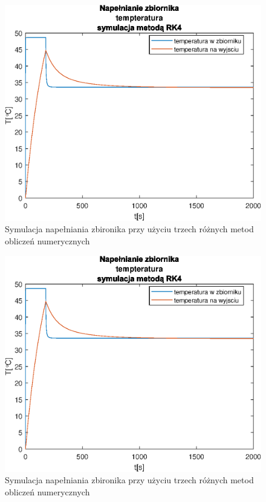 \begin{figure}[tb]
   \centering
   \includegraphics{img/object-simulation/method-comparison-flow.eps}
   \caption{Symulacja napełniania zbironika przy użyciu trzech różnych metod obliczeń numerycznych}
   \label{fig:method-comparison-flow}
\end{figure}
            
\begin{figure}[tb]
   \centering
   \includegraphics{img/object-simulation/method-comparison-flow.eps}
   \caption{Symulacja napełniania zbironika przy użyciu trzech różnych metod obliczeń numerycznych}
   \label{fig:method-comparison-flow}
\end{figure}
            
